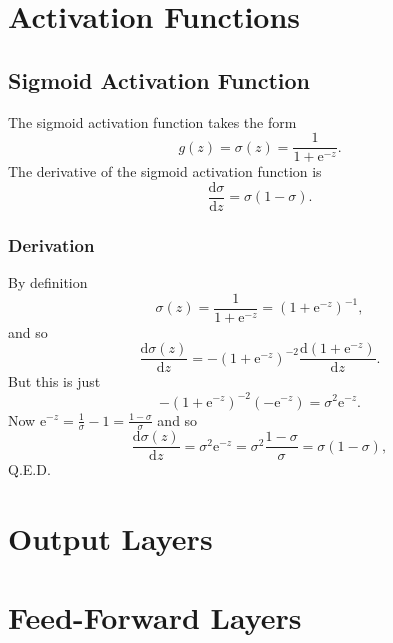 \documentclass[modern]{aastex61}
\newcommand{\ue}{\mathrm{e}}
\newcommand{\uderivative}{\mathrm{d}}
\begin{document}
\section{Activation Functions} \label{sec:act}

\subsection{Sigmoid Activation Function} \label{sec:sigmoid}

The sigmoid activation function takes the form
\begin{equation} \label{eq:sigmoid}
  g(z) = \sigma(z) = \frac{1}{1 + \ue^{-z}}.
\end{equation}
The derivative of the sigmoid activation function is
\begin{equation} \label{eq:sigmoidderivative}
  \frac{\uderivative \sigma}{\uderivative z} = \sigma(1 - \sigma).
\end{equation}

\subsubsection{Derivation}

By definition
\begin{equation*}
  \sigma(z) = \frac{1}{1 + \ue^{-z}} = (1 + \ue^{-z})^{-1},
\end{equation*}
and so
\begin{equation*}
  \frac{\uderivative \sigma(z)}{\uderivative z} = -(1 + \ue^{-z})^{-2} \frac{\uderivative (1 + \ue^{-z}) }{\uderivative z}.
\end{equation*}
But this is just
\begin{equation*}
  -(1 + \ue^{-z})^{-2} (-\ue^{-z}) = \sigma^{2} \ue^{-z}.
\end{equation*}
Now $\ue^{-z} = \frac{1}{\sigma} - 1 = \frac{1 - \sigma}{\sigma}$ and so
\begin{equation*}
  \frac{\uderivative \sigma(z)}{\uderivative z} = \sigma^{2} \ue^{-z} = \sigma^{2} \frac{1 - \sigma}{\sigma} = \sigma (1 - \sigma),
\end{equation*}
Q.E.D.

\section{Output Layers} \label{sec:out}

\section{Feed-Forward Layers} \label{sec:ff}
\end{document}

